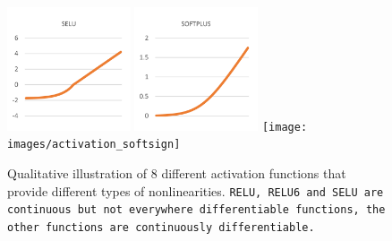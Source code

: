 \begin{figure}[H]
{\includegraphics[width=0.325\textwidth]{images/activation_selu}}
{\includegraphics[width=0.325\textwidth]{images/activation_softplus}}
{\texttt{[image: images/activation\_softsign]}}
\vspace{1em}
\caption[Activation Functions]{Qualitative illustration of 8 different activation functions that provide different types of nonlinearities. \tt{RELU}, \tt{RELU6} and \tt{SELU} are continuous but not everywhere differentiable functions, the other functions are continuously differentiable.}
\label{f.postagging.activation}
\end{figure}

